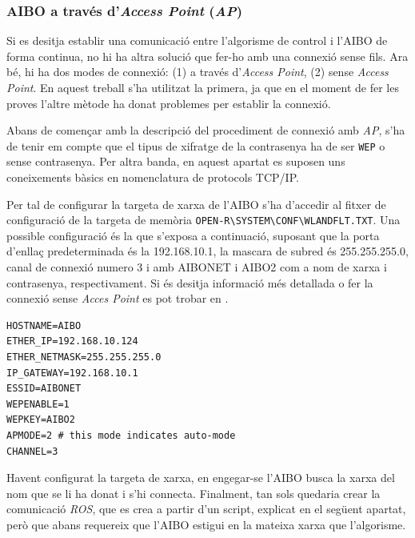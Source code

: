 \documentclass[12pt,a4paper,final,twoside]{article}
\begin{document}
\subsubsection{AIBO a través d'\texttt{}\textit{Access Point} (\textit{AP})}

Si es desitja establir una comunicació entre l'algorisme de control i l'AIBO de forma continua, no hi ha altra solució que fer-ho amb una connexió sense fils. Ara bé, hi ha dos modes de connexió: (1) a través d'\textit{Access Point}, (2) sense \textit{Access Point}. En aquest treball s'ha utilitzat la primera, ja que en el moment de fer les proves l'altre mètode ha donat problemes per establir la connexió.

Abans de començar amb la descripció del procediment de connexió amb \textit{AP}, s'ha de tenir em compte que el tipus de xifratge de la contrasenya ha de ser \texttt{WEP} o sense contrasenya. Per altra banda, en aquest apartat es suposen uns coneixements bàsics en nomenclatura de protocols TCP/IP.

Per tal de configurar la targeta de xarxa de l'AIBO s'ha d'accedir al fitxer de configuració de la targeta de memòria \texttt{OPEN-R\textbackslash SYSTEM\textbackslash CONF\textbackslash WLANDFLT.TXT}. Una possible configuració és la que s'exposa a continuació, suposant que la porta d'enllaç predeterminada és la 192.168.10.1, la mascara de subred és 255.255.255.0, canal de connexió numero 3 i amb AIBONET i AIBO2 com a nom de xarxa i contrasenya, respectivament. Si és desitja informació més detallada o fer la connexió sense \textit{Acces Point} es pot trobar en \cite{Tellez2004}.


\begin{verbatim}
HOSTNAME=AIBO
ETHER_IP=192.168.10.124
ETHER_NETMASK=255.255.255.0
IP_GATEWAY=192.168.10.1
ESSID=AIBONET
WEPENABLE=1
WEPKEY=AIBO2
APMODE=2 # this mode indicates auto-mode
CHANNEL=3
\end{verbatim}

Havent configurat la targeta de xarxa, en engegar-se l'AIBO busca la xarxa del nom que se li ha donat i s'hi connecta. Finalment, tan sols quedaria crear la comunicació \textit{ROS}, que es crea a partir d'un script, explicat en el següent apartat, però que abans requereix que l'AIBO estigui en la mateixa xarxa que l'algorisme.
\end{document}
